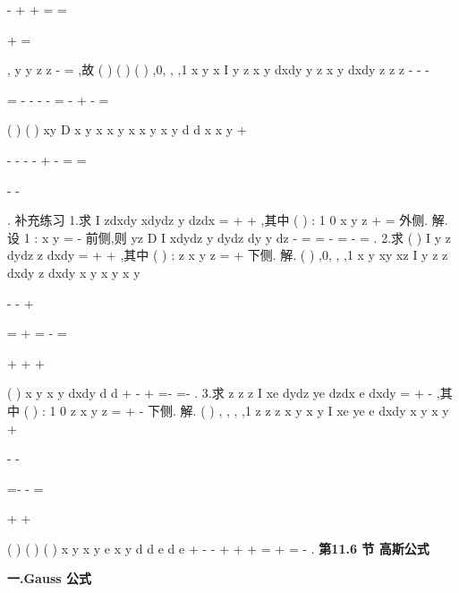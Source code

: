 -
+
+
=
\Rightarrow 
\Rightarrow 
=

+
=

,
y
y
z
z
-
=
,故 
(
)
(
)
(
)
,0,
,
,1
x
y
x
I
y
z
x
y
dxdy
y
z
x
y
dxdy
z
z
z
\Sigma 
\Sigma 
-
-
-




=
-
-
\cdots -
-
=
-
+
-
=








\int \int 
\int \int 
(
)
(
)
xy
D
x
y
x
x
y
x
x
y
x
y
d
d
x
x
y
\sigma 
\sigma 
\pi 
+
\le 


-
-
-
-
+
-
=
\cdots 
=



-
-



\int \int 
\int \int 
. 
\textcolor{lyred}{补充练习} 
1.求
I
zdxdy
xdydz
y dzdx
\Sigma 
=
+
+
\int \int 
,其中
(
)
:
1 0
x
y
z
\Sigma 
+
=
\le 
\le 
外侧. 
解.设
1 :
x
y
\Sigma 
=
-
前侧,则 
yz
D
I
xdydz
y dydz
dy
y dz
\pi 
\Sigma 
-
=
=
-
=
-
=
\int \int 
\int \int 
\int 
\int 
. 
2.求
(
)
I
y
z dydz
z dxdy
\Sigma 
=
+
+
\int \int 
,其中
(
)
:
z
x
y
z
\Sigma 
=
+
\le 
\le 
下侧. 
解.
(
)
,0,
,
,1
x
y
xy
xz
I
y
z
z
dxdy
z
dxdy
x
y
x
y
x
y
\Sigma 
\Sigma 




-
-
+




=
+
\cdots 
=
-
=




+
+
+




\int \int 
\int \int 
(
)
x
y
x
y
dxdy
d
d
\pi 
\theta \rho 
\rho \rho 
\pi 
\le 
+
\le 
-
+
=-
\cdots 
=-
\int \int 
\int 
\int 
. 
3.求
z
z
z
I
xe dydz
ye dzdx
e dxdy
\Sigma 
=
+
-
\int \int 
,其中
(
)
:
1 0
z
x
y
z
\Sigma 
=
+
-
\le 
\le 
下侧. 
解.
(
)
,
,
,
,1
z
z
z
x
y
x
y
I
xe
ye
e
dxdy
x
y
x
y
\le 
+
\le 


-
-


=-
-
\cdots 
=


+
+


\int \int 
(
)
(
)
(
)
x
y
x
y
e
x
y
d
d
e
d
e
\pi 
\rho 
\sigma 
\theta 
\rho 
\rho \rho 
\pi 
+
-
-
\le 
+
\le 
+
+
=
+
\cdots 
=
-
\int \int 
\int 
\int 
. 
\vspace{6pt}
{\large \bfseries \textcolor{lyred}{第11.6 节 高斯公式}}

\vspace{4pt}
{\bfseries \textcolor{lyred}{一.Gauss 公式}}

